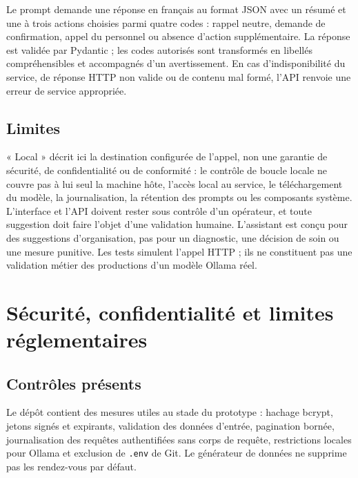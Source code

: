 \documentclass[11pt,a4paper]{report}
\newcommand{\code}[1]{\texttt{#1}}
\begin{document}
Le prompt demande une réponse en français au format JSON avec un résumé et
une à trois actions choisies parmi quatre codes : rappel neutre, demande de
confirmation, appel du personnel ou absence d'action supplémentaire. La
réponse est validée par Pydantic ; les codes autorisés sont transformés en
libellés compréhensibles et accompagnés d'un avertissement. En cas d'indisponibilité
du service, de réponse HTTP non valide ou de contenu mal formé, l'API renvoie
une erreur de service appropriée.

\section{Limites}
« Local » décrit ici la destination configurée de l'appel, non une garantie
de sécurité, de confidentialité ou de conformité : le contrôle de boucle
locale ne couvre pas à lui seul la machine hôte, l'accès local au service, le
téléchargement du modèle, la journalisation, la rétention des prompts ou les
composants système. L'interface et l'API doivent rester sous contrôle d'un
opérateur, et toute suggestion doit faire l'objet d'une validation humaine.
L'assistant est conçu pour des suggestions d'organisation, pas pour un
diagnostic, une décision de soin ou une mesure punitive. Les tests simulent
l'appel HTTP ; ils ne constituent pas une validation métier des productions
d'un modèle Ollama réel.

\chapter{Sécurité, confidentialité et limites réglementaires}
\section{Contrôles présents}
Le dépôt contient des mesures utiles au stade du prototype : hachage bcrypt,
jetons signés et expirants, validation des données d'entrée, pagination
bornée, journalisation des requêtes authentifiées sans corps de requête,
restrictions locales pour Ollama et exclusion de \code{.env} de Git. Le
générateur de données ne supprime pas les rendez-vous par défaut.
\end{document}
